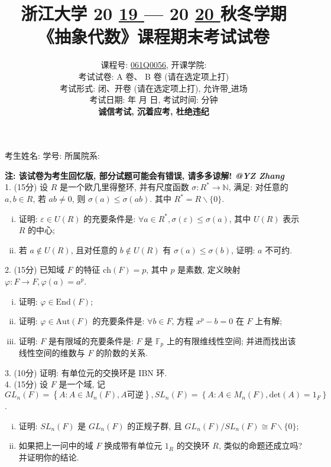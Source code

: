 \documentclass[UTF8]{ctexart}
\title{
\textbf{浙江大学 }20 \underline{ 19 } — 20 \underline{ 20 } \textbf{秋冬学期} \\
\textbf{《抽象代数》课程期末考试试卷}
}
\author{
课程号: \underline{ \quad061Q0056\quad }, 开课学院: \underline{ \quad数学科学学院\quad } \\
考试试卷: \checkmark A 卷、 B 卷 (请在选定项上打\checkmark) \\
考试形式: \checkmark 闭、开卷 (请在选定项上打\checkmark), 允许带\underline{ \quad无\quad  }进场 \\
考试日期: \underline{ \quad2020\quad } 年 \underline{ \quad01\quad } 月 \underline{ \quad17\quad } 日, 考试时间: \underline{ \quad120\quad }分钟 \\
\textbf{诚信考试, 沉着应考, 杜绝违纪}
}
\date{}
\begin{document}
\maketitle

\begin{center}
考生姓名: \underline{\quad\quad\quad\quad\quad\quad\quad\quad\quad\quad}  学号: \underline{\quad\quad\quad\quad\quad\quad\quad\quad\quad\quad}  所属院系: \underline{\quad\quad\quad\quad\quad\quad\quad\quad\quad\quad}
\end{center}

\textbf{注: 该试卷为考生回忆版, 部分试题可能会有错误, 请多多谅解! \textit{@YZ Zhang}}
\\

1. (15分) 设 $R$ 是一个欧几里得整环, 并有尺度函数 $\sigma:R^*\rightarrow\mathbb{N}$, 满足: 对任意的 $a,b\in R$, 若 $ab\neq0$, 则 $\sigma(a)\le\sigma(ab)$. 其中 $R^*=R\backslash\{0\}$.
\begin{enumerate}[(i)]
  \item 证明: $\varepsilon\in U(R)$ 的充要条件是: $\forall a\in R^*, \sigma(\varepsilon)\le\sigma(a)$, 其中 $U(R)$ 表示 $R$ 的中心;
  \item 若 $a\notin U(R)$, 且对任意的 $b\notin U(R)$ 有 $\sigma(a)\le\sigma(b)$, 证明: $a$ 不可约.\\
\end{enumerate}

2. (15分) 已知域 $F$ 的特征 $\text{ch}(F)=p$, 其中 $p$ 是素数, 定义映射 $\varphi:F\rightarrow F, \varphi(a)=a^p$.
\begin{enumerate}[(i)]
  \item 证明: $\varphi\in\text{End}(F)$;
  \item 证明: $\varphi\in\text{Aut}(F)$ 的充要条件是: $\forall b\in F$, 方程 $x^p-b=0$ 在 $F$ 上有解;
  \item 证明: $F$ 是有限域的充要条件是: $F$ 是 $\mathbb{F}_p$ 上的有限维线性空间; 并进而找出该线性空间的维数与 $F$ 的阶数的关系.\\
\end{enumerate}

3. (10分) 证明: 有单位元的交换环是  IBN 环.
\\

4. (15分) 设 $F$ 是一个域, 记 $\displaystyle GL_n(F)=\left\{A:A\in M_n(F), A\text{可逆}\right\}, SL_n(F)=\left\{A:A\in M_n(F), \text{det}(A)=1_F\right\}$.
\begin{enumerate}[(i)]
  \item 证明: $SL_n(F)$ 是 $GL_n(F)$ 的正规子群, 且 $GL_n(F)/SL_n(F)\cong F\backslash\{0\}$;
  \item 如果把上一问中的域 $F$ 换成带有单位元 $1_R$ 的交换环 $R$, 类似的命题还成立吗? 并证明你的结论.\\
\end{enumerate}
\end{document}
